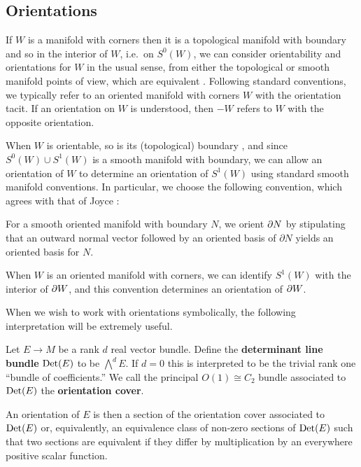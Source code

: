 \subsection{Orientations}\label{S: orientations}

If $W$ is a manifold with corners then it is a topological manifold with boundary and so in the interior of $W$, i.e.\ on $S^0(W)$, we can consider orientability and orientations for $W$ in the usual sense, from either the topological or smooth manifold points of view, which are equivalent \cite[Theorem~VI.7.15]{Bred97}.
Following standard conventions, we typically refer to an oriented manifold with corners $W$ with the orientation tacit.
If an orientation on $W$ is understood, then $-W$ refers to $W$ with the opposite orientation.

When $W$ is orientable, so is its (topological) boundary \cite[Lemma~6.9.1]{Bred97}, and since $S^0(W)\cup S^1(W)$ is a smooth manifold with boundary, we can allow an orientation of $W$ to determine an orientation of $S^1(W)$ using standard smooth manifold conventions.
In particular, we choose the following convention, which agrees with that of Joyce \cite[Convention~7.2.a]{Joy12}:

\begin{convention}\label{Con: oriented boundary}
	For a smooth oriented manifold with boundary $N$, we orient $\partial N$ by stipulating that an outward normal vector followed by an oriented basis of $\partial N$ yields an oriented basis for $N$.
\end{convention}

When $W$ is an oriented manifold with corners, we can identify $S^1(W)$ with the interior of $\partial W$, and this convention determines an orientation of $\partial W$.

When we wish to work with orientations symbolically, the following interpretation will be extremely useful.

\begin{definition}\label{D: det bundle}
	Let $E \to M$ be a rank $d$ real vector bundle.
	Define the \textbf{determinant line bundle}
	${\rm Det}(E)$ to be $\bigwedge^d E$.
	If $d = 0$ this is interpreted to be the trivial rank one ``bundle of coefficients.''
	We call the principal $O(1) \cong C_2$ bundle associated to ${\rm Det}(E)$ the \textbf{orientation cover}.

	An orientation of $E$ is then a section of the orientation cover associated to ${\rm Det}(E)$ or, equivalently, an equivalence class of non-zero sections of ${\rm Det}(E)$ such that two sections are equivalent if they differ by multiplication by an everywhere positive scalar function.
\end{definition}

